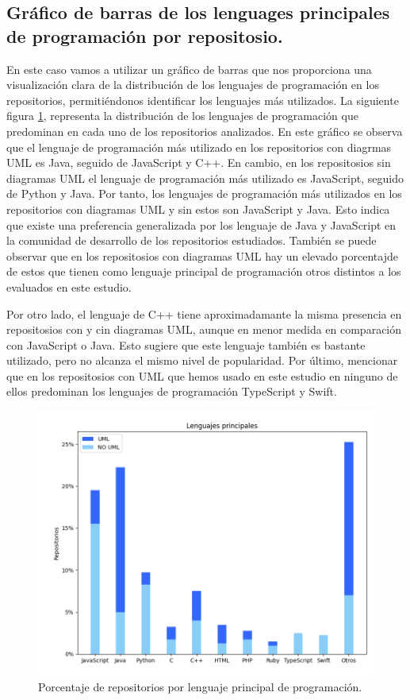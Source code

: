 \documentclass[a4paper, 12pt]{book}
\begin{document}
\subsection{Gráfico de barras de los lenguages principales de programación por repositosio.}
\label{sec:Gráfico de barras de los lenguages principales de programación por repositosio}

En este caso vamos a utilizar un gráfico de barras que nos proporciona una visualización clara de la distribución de los lenguajes de programación en los repositorios, permitiéndonos identificar los lenguajes más utilizados.
La siguiente figura \ref{fig:Figure_language}, representa la distribución de los lenguajes de programación que predominan en cada uno de los repositorios analizados.
En este gráfico se observa que el lenguaje de programación más utilizado en los repositorios con diagrmas UML es Java, seguido de JavaScript y C++.
En cambio, en los repositosios sin diagramas UML el lenguaje de programación más utilizado es JavaScript, seguido de Python y Java.
Por tanto, los lenguajes de programación más utilizados en los repositorios con diagramas UML y sin estos son JavaScript y Java. 
Esto indica que existe una preferencia generalizada por los lenguaje de Java y JavaScript en la comunidad de desarrollo de los repositorios estudiados.
También se puede observar que en los repositosios con diagramas UML hay un elevado porcentajde de estos que tienen como lenguaje principal de programación otros distintos a los evaluados en este estudio.


Por otro lado, el lenguaje de C++ tiene aproximadamante la misma presencia en repositosios con y cin diagramas UML, aunque en menor medida en comparación con JavaScript o Java.
Esto sugiere que este lenguaje también es bastante utilizado, pero no alcanza el mismo nivel de popularidad.
Por último, mencionar que en los repositosios con UML que hemos usado en este estudio en ninguno de ellos predominan los lenguajes de programación TypeScript y Swift.

\begin{figure}
  \centering
  \includegraphics[width=12cm, keepaspectratio]{img/Figure_languages.png}
  \caption{Porcentaje de repositorios por lenguaje principal de programación.}\label{fig:Figure_language}
\end{figure}
\end{document}

